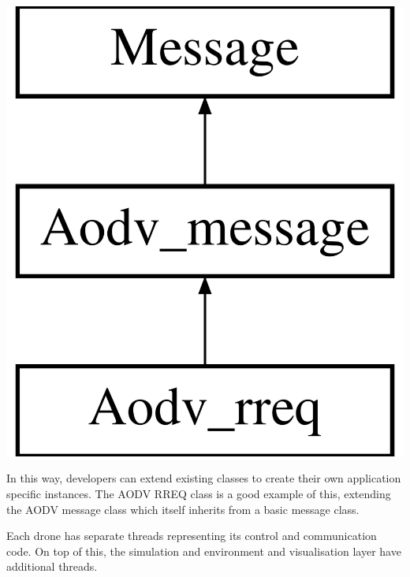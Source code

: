 \documentclass[landscape,a0paper,fontscale=0.285]{baposter} %
\begin{document}
\begin{poster}
{\begin{minipage}{0.4\linewidth}
\includegraphics[scale=0.15]{rreq}
\end{minipage}
\begin{minipage}{0.6\linewidth}
In this way, developers can extend existing classes to create their own application specific instances. The AODV RREQ class is a good example of this, extending the AODV message class which itself inherits from a basic message class.
\end{minipage}
\newline

Each drone has separate threads representing its control and communication code. On top of this, the simulation and environment and visualisation layer have additional threads.

}
\end{poster}
\end{document}
